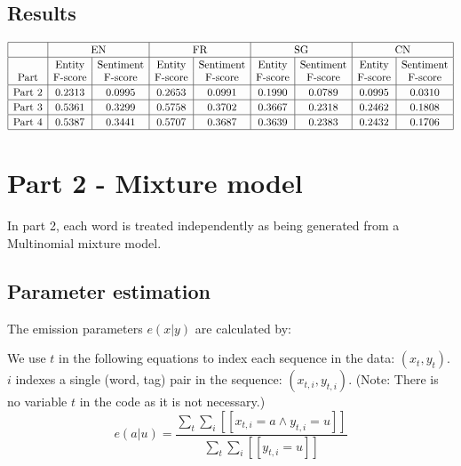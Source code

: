 \documentclass[12pt]{article}
\begin{document}
\subsection{Results}
\[
\begin{array}{|c|c|c|c|c|c|c|c|c|}
\hline \rule{0pt}{1em}
& \multicolumn{2}{c|}{\mbox{EN}}
& \multicolumn{2}{c|}{\mbox{FR}}
& \multicolumn{2}{c|}{\mbox{SG}}
& \multicolumn{2}{c|}{\mbox{CN}} \\
\hline \rule{0pt}{1em}
            & \mbox{Entity} & \mbox{Sentiment} 
            & \mbox{Entity} & \mbox{Sentiment}
            & \mbox{Entity} & \mbox{Sentiment}
            & \mbox{Entity} & \mbox{Sentiment} \\
\mbox{Part} & \mbox{F-score} & \mbox{F-score} 
            & \mbox{F-score} & \mbox{F-score}
            & \mbox{F-score} & \mbox{F-score}
            & \mbox{F-score} & \mbox{F-score} \\
\hline \rule{0pt}{1em}
\mbox{Part 2} & 0.2313 & 0.0995 & 0.2653 & 0.0991 & 0.1990 & 0.0789 & 0.0995 & 0.0310 \\
\hline \rule{0pt}{1em}
\mbox{Part 3} & 0.5361 & 0.3299 & 0.5758 & 0.3702 & 0.3667 & 0.2318 & 0.2462 & 0.1808 \\
\hline \rule{0pt}{1em}
\mbox{Part 4} & 0.5387 & 0.3441 & 0.5707 & 0.3687 & 0.3639 & 0.2383 & 0.2432 & 0.1706 \\
\hline
\end{array}
\]



\pagebreak

\section{Part 2 - Mixture model}

In part 2, each word is treated independently as being generated from a Multinomial mixture model.

\subsection{Parameter estimation}

The emission parameters \(e(x|y)\) are calculated by:

We use \(t\) in the following equations to index each sequence in the data: \((x_t, y_t)\). \(i\) indexes a single (word, tag) pair in the sequence: \((x_{t,i}, y_{t,i})\). (Note: There is no variable \(t\) in the code as it is not necessary.)
\[ e(a|u) = \frac{\sum_t \sum_i [[x_{t,i}=a \land y_{t,i}=u]] }{\sum_{t} \sum_i [[y_{t,i}=u]] } \]
\end{document}
